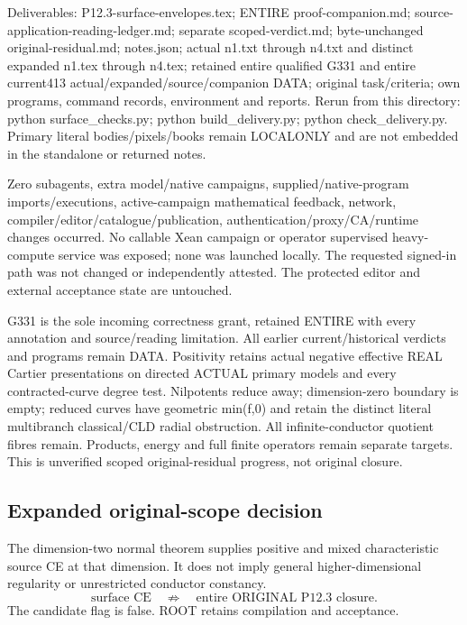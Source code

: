 Deliverables: P12.3-surface-envelopes.tex; ENTIRE proof-companion.md; source-application-reading-ledger.md; separate scoped-verdict.md; byte-unchanged original-residual.md; notes.json; actual n1.txt through n4.txt and distinct expanded n1.tex through n4.tex; retained entire qualified G331 and entire current413 actual/expanded/source/companion DATA; original task/criteria; own programs, command records, environment and reports. Rerun from this directory: python surface\_checks.py; python build\_delivery.py; python check\_delivery.py. Primary literal bodies/pixels/books remain LOCALONLY and are not embedded in the standalone or returned notes.

Zero subagents, extra model/native campaigns, supplied/native-program imports/executions, active-campaign mathematical feedback, network, compiler/editor/catalogue/publication, authentication/proxy/CA/runtime changes occurred. No callable Xean campaign or operator supervised heavy-compute service was exposed; none was launched locally. The requested signed-in path was not changed or independently attested. The protected editor and external acceptance state are untouched.

G331 is the sole incoming correctness grant, retained ENTIRE with every annotation and source/reading limitation. All earlier current/historical verdicts and programs remain DATA. Positivity retains actual negative effective REAL Cartier presentations on directed ACTUAL primary models and every contracted-curve degree test. Nilpotents reduce away; dimension-zero boundary is empty; reduced curves have geometric min(f,0) and retain the distinct literal multibranch classical/CLD radial obstruction. All infinite-conductor quotient fibres remain. Products, energy and full finite operators remain separate targets. This is unverified scoped original-residual progress, not original closure.

\subsection*{Expanded original-scope decision}
The dimension-two normal theorem supplies positive and mixed
characteristic source CE at that dimension. It does not imply general
higher-dimensional regularity or unrestricted conductor constancy.
\[
 \text{surface CE}\quad\not\Longrightarrow\quad
 \text{entire ORIGINAL P12.3 closure}.
\]
The candidate flag is false. ROOT retains compilation and acceptance.
